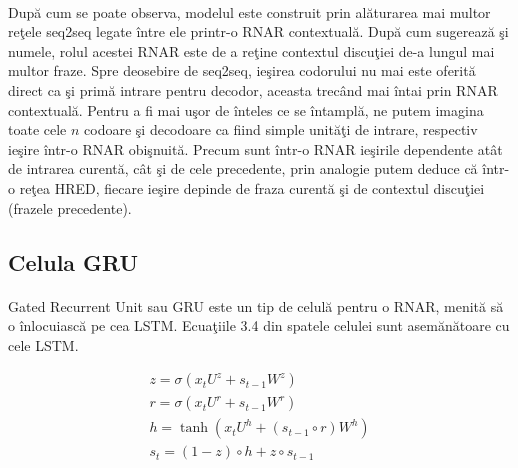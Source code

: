 \paragraph{}
Dup\u a cum se poate observa, modelul este construit prin al\u aturarea mai multor re\c tele seq2seq legate \^ intre ele printr-o RNAR contextual\u a. Dup\u a cum sugereaz\u a \c si numele, rolul acestei RNAR este de a re\c tine contextul discu\c tiei de-a lungul mai multor fraze. Spre deosebire de seq2seq, ie\c sirea codorului nu mai este oferit\u a direct ca \c si prim\u a intrare pentru decodor, aceasta trec\^ and mai \^ intai prin RNAR contextual\u a. Pentru a fi mai u\c sor de \^ inteles ce se \^ intampl\u a, ne putem imagina toate cele \(n\) codoare \c si decodoare ca fiind simple unit\u a\c ti de intrare, respectiv ie\c sire \^ intr-o RNAR obi\c snuit\u a. Precum sunt \^ intr-o RNAR ie\c sirile dependente at\^ at de intrarea curent\u a, c\^ at \c si de cele precedente, prin analogie putem deduce c\u a \^ intr-o re\c tea HRED, fiecare ie\c sire depinde de fraza curent\u a \c si de contextul discu\c tiei (frazele precedente).

\subsection{Celula GRU}

\paragraph{}
Gated Recurrent Unit sau GRU \cite{DBLP:journals/corr/ChungGCB14} este un tip de celul\u a pentru o RNAR, menit\u a s\u a o \^ inlocuiasc\u a pe cea LSTM. Ecua\c tiile 3.4 din spatele celulei sunt asem\u an\u atoare cu cele LSTM.

\begin{equation}
\begin{split}
z = \sigma(x_{t}U^{z} + s_{t-1}W^{z})\\
r = \sigma(x_{t}U^{r} + s_{t-1}W^{r})\\
h = \tanh(x_{t}U^{h} + (s_{t-1} \circ r)W^{h})\\
s_{t} = (1 - z) \circ h + z \circ s_{t-1}\\
\end{split}
\end{equation}

